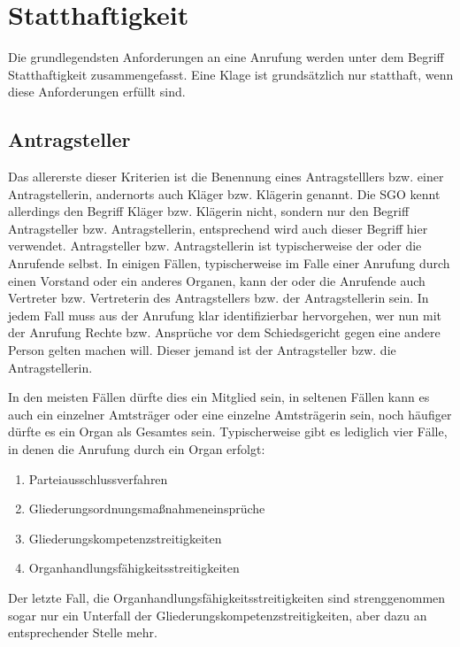\section{Statthaftigkeit}
\label{Anrufung:Statthaftigkeit}
Die grundlegendsten Anforderungen an eine Anrufung werden unter dem Begriff Statthaftigkeit zusammengefasst.
Eine Klage ist grundsätzlich nur statthaft, wenn diese Anforderungen erfüllt sind.

\subsection{Antragsteller}
\label{Anrufung:Statthaftigkeit:Antragsteller}
Das allererste dieser Kriterien ist die Benennung eines  Antragstelllers bzw. einer Antragstellerin, andernorts auch Kläger bzw. Klägerin genannt.
Die SGO kennt allerdings den Begriff Kläger bzw. Klägerin nicht, sondern nur den Begriff Antragsteller bzw. Antragstellerin, entsprechend wird auch dieser Begriff hier verwendet.
Antragsteller bzw. Antragstellerin ist typischerweise der oder die Anrufende selbst.
In einigen Fällen, typischerweise im Falle einer Anrufung durch einen Vorstand oder ein anderes Organen, kann der oder die Anrufende auch Vertreter bzw. Vertreterin des Antragstellers bzw. der Antragstellerin sein.
In jedem Fall muss aus der Anrufung klar identifizierbar hervorgehen, wer nun mit der Anrufung Rechte bzw. Ansprüche vor dem Schiedsgericht gegen eine andere Person gelten machen will.
Dieser jemand ist der Antragsteller bzw. die Antragstellerin.

In den meisten Fällen dürfte dies ein Mitglied sein, in seltenen Fällen kann es auch ein einzelner Amtsträger oder eine einzelne Amtsträgerin sein, noch häufiger dürfte es ein Organ als Gesamtes sein.
Typischerweise gibt es lediglich vier Fälle, in denen die Anrufung durch ein Organ erfolgt:
\begin{enumerate}[label=\arabic*.)]
\item Parteiausschlussverfahren
\item Gliederungsordnungsmaßnahmeneinsprüche
\item Gliederungskompetenzstreitigkeiten
\item Organhandlungsfähigkeitsstreitigkeiten
\end{enumerate}
Der letzte Fall, die Organhandlungsfähigkeitsstreitigkeiten sind strenggenommen sogar nur ein Unterfall der Gliederungskompetenzstreitigkeiten, aber dazu an entsprechender Stelle mehr.

